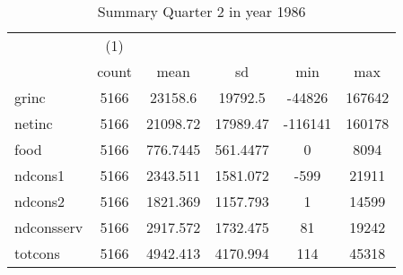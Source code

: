 \begin{table}[htbp]\centering
\def\sym#1{\ifmmode^{#1}\else\(^{#1}\)\fi}
\caption{Summary Quarter 2 in year 1986 \label{sum\_Q2\_y1986}}
\begin{tabular}{l*{1}{ccccc}}
\hline\hline
            &\multicolumn{1}{c}{(1)}&            &            &            &            \\
            &       count&        mean&          sd&         min&         max\\
\hline
grinc       &        5166&     23158.6&     19792.5&      -44826&      167642\\
netinc      &        5166&    21098.72&    17989.47&     -116141&      160178\\
food        &        5166&    776.7445&    561.4477&           0&        8094\\
ndcons1     &        5166&    2343.511&    1581.072&        -599&       21911\\
ndcons2     &        5166&    1821.369&    1157.793&           1&       14599\\
ndconsserv  &        5166&    2917.572&    1732.475&          81&       19242\\
totcons     &        5166&    4942.413&    4170.994&         114&       45318\\
\hline\hline
\end{tabular}
\end{table}
